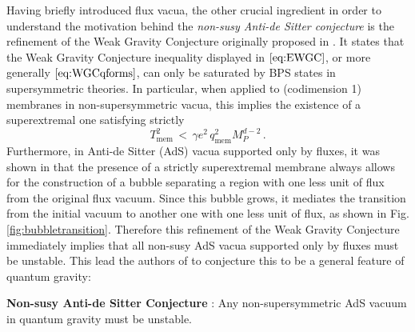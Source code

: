 \documentclass[11pt,a4paper]{article}
\begin{document}
Having briefly introduced flux vacua, the other crucial ingredient in order to understand the motivation behind the \emph{non-susy Anti-de Sitter conjecture} is  the refinement of the Weak Gravity Conjecture originally proposed in \cite{Ooguri:2016pdq}. It states that the Weak Gravity Conjecture inequality displayed in $\eqref{eq:EWGC}$, or more generally $\eqref{eq:WGCqforms}$, can only be saturated by BPS states in supersymmetric theories. In particular, when applied to (codimension 1) membranes in non-supersymmetric vacua, this implies the existence of  a superextremal one satisfying strictly
\begin{equation}
      T_{\mathrm{mem}}^{2} \, < \, \gamma e^2 \,  q_{\mathrm{mem}}^{2} M_P^{d-2}\, .
    \label{eq:WGCmemstrict}
\end{equation}
Furthermore, in Anti-de Sitter (AdS) vacua supported only by fluxes, it was shown in \cite{Maldacena:1998uz} that the presence of a strictly superextremal membrane always allows for the construction of a bubble separating a region with one less unit of flux from the original flux vacuum. Since this bubble grows, it mediates the transition from the initial vacuum to another one with one less unit of flux, as shown in Fig. \ref{fig:bubbletransition}. Therefore this refinement of the Weak Gravity Conjecture immediately implies that all non-susy AdS vacua supported only by fluxes must be unstable. This lead the authors of \cite{Ooguri:2018wrx} to conjecture this to be a general feature of quantum gravity:
\vspace{0.2cm}
\begin{tcolorbox}[colback=boxblue]
\textbf{Non-susy Anti-de Sitter Conjecture} \cite{Ooguri:2018wrx}: Any non-supersymmetric AdS vacuum in quantum gravity must be unstable.
\end{tcolorbox}
\end{document}

